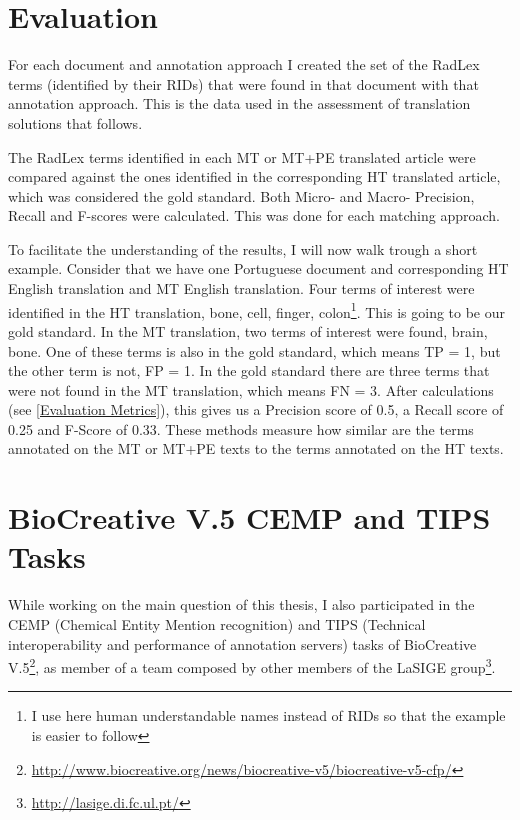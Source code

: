 \section{Evaluation}

For each document and annotation approach I created the set of the RadLex terms (identified by their RIDs) that were found in that document with that annotation approach. This is the data used in the assessment of translation solutions that follows.

The RadLex terms identified in each MT or MT+PE translated article were compared against the ones identified in the corresponding HT translated article, which was considered the gold standard. Both Micro- and Macro- Precision, Recall and F-scores were calculated. This was done for each matching approach. 

To facilitate the understanding of the results, I will now walk trough a short example. Consider that we have one Portuguese document and corresponding HT English translation and MT English translation. Four terms of interest were identified in the HT translation, {bone, cell, finger, colon}\footnote{I use here human understandable names instead of RIDs so that the example is easier to follow}. This is going to be our gold standard. In the MT translation, two terms of interest were found, {brain, bone}. One of these terms is also in the gold standard, which means TP = 1, but the other term is not, FP = 1. In the gold standard there are three terms that were not found in the MT translation, which means FN = 3. After calculations (see \ref{Evaluation Metrics}), this gives us a Precision score of 0.5, a Recall score of 0.25 and F-Score of 0.33. These methods measure how similar are the terms annotated on the MT or MT+PE texts to the terms annotated on the HT texts.

\section{BioCreative V.5 CEMP and TIPS Tasks}
\label{biocreative}

While working on the main question of this thesis, I also participated in the CEMP (Chemical Entity Mention recognition) and TIPS (Technical interoperability and performance of annotation servers) tasks of BioCreative V.5\footnote{\url{http://www.biocreative.org/news/biocreative-v5/biocreative-v5-cfp/}}, as member of a team composed by other members of the LaSIGE group\footnote{\url{http://lasige.di.fc.ul.pt/}}.

